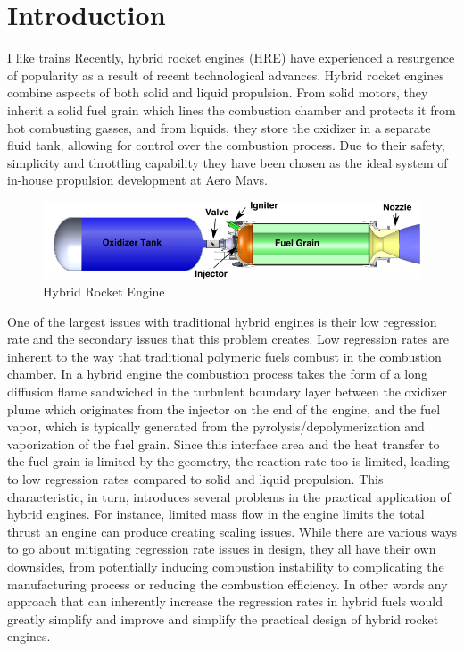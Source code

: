 \section{Introduction}
\label{sec:introduction}
I like trains
Recently, hybrid rocket engines (HRE) have experienced
a resurgence of popularity as a result of recent technological advances. Hybrid rocket engines combine aspects of both solid and liquid propulsion. From solid motors, they inherit a solid fuel grain which lines the combustion chamber and protects it from hot combusting gasses, and from liquids, they store the oxidizer in a separate fluid tank, allowing for control over the combustion process. Due to their safety, simplicity and throttling capability they have been chosen as the ideal system of in-house propulsion development at Aero Mavs.

\begin{figure}[h]
    \centering
    \includegraphics[width=1\linewidth]{Figures/hybridthingi.png}
    \caption{Hybrid Rocket Engine\cite{HybridImage}}
    \label{fig:placeholder1}
\end{figure}

One of the largest issues with traditional hybrid engines is their low regression rate and the secondary issues that this problem creates. Low regression rates are inherent to the way that traditional polymeric fuels combust in the combustion chamber. In a hybrid engine the combustion process takes the form of a long diffusion flame sandwiched in the turbulent boundary layer between the oxidizer plume which originates from the injector on the end of the engine, and the fuel vapor, which is typically generated from the pyrolysis/depolymerization and vaporization of the fuel grain\cite{HumbleHybrid}. Since this interface area and the heat transfer to the fuel grain is limited by the geometry, the reaction rate too is limited, leading to low regression rates compared to solid and liquid propulsion. This characteristic, in turn, introduces several problems in the practical application of hybrid engines. For instance, limited mass flow in the engine limits the total thrust an engine can produce creating scaling issues. While there are various ways to go about mitigating regression rate issues in design, they all have their own downsides, from potentially inducing combustion instability to complicating the manufacturing process or reducing the combustion efficiency. In other words any approach that can inherently increase the regression rates in hybrid fuels would greatly simplify and improve and simplify the practical design of hybrid rocket engines.

